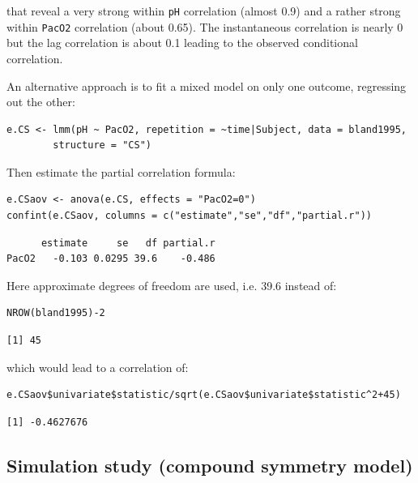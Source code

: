 \documentclass[12pt]{article}
\begin{document}
that reveal a very strong within \texttt{pH} correlation (almost 0.9) and a
rather strong within \texttt{PacO2} correlation (about 0.65). The
instantaneous correlation is nearly 0 but the lag correlation is about
0.1 leading to the observed conditional correlation.

\bigskip

An alternative approach is to fit a mixed model on only one outcome,
regressing out the other:
\lstset{language=r,label= ,caption= ,captionpos=b,numbers=none}
\begin{lstlisting}
e.CS <- lmm(pH ~ PacO2, repetition = ~time|Subject, data = bland1995,
	    structure = "CS")
\end{lstlisting}

Then estimate the partial correlation formula:
\lstset{language=r,label= ,caption= ,captionpos=b,numbers=none}
\begin{lstlisting}
e.CSaov <- anova(e.CS, effects = "PacO2=0")
confint(e.CSaov, columns = c("estimate","se","df","partial.r"))
\end{lstlisting}

\begin{verbatim}
      estimate     se   df partial.r
PacO2   -0.103 0.0295 39.6    -0.486
\end{verbatim}


\clearpage

Here approximate degrees of freedom are used, i.e. 39.6 instead of:
\lstset{language=r,label= ,caption= ,captionpos=b,numbers=none}
\begin{lstlisting}
NROW(bland1995)-2
\end{lstlisting}

\begin{verbatim}
[1] 45
\end{verbatim}


which would lead to a correlation of:
\lstset{language=r,label= ,caption= ,captionpos=b,numbers=none}
\begin{lstlisting}
e.CSaov$univariate$statistic/sqrt(e.CSaov$univariate$statistic^2+45)
\end{lstlisting}

\begin{verbatim}
[1] -0.4627676
\end{verbatim}

\subsection{Simulation study (compound symmetry model)}
\label{sec:org22ecc7b}
\end{document}
